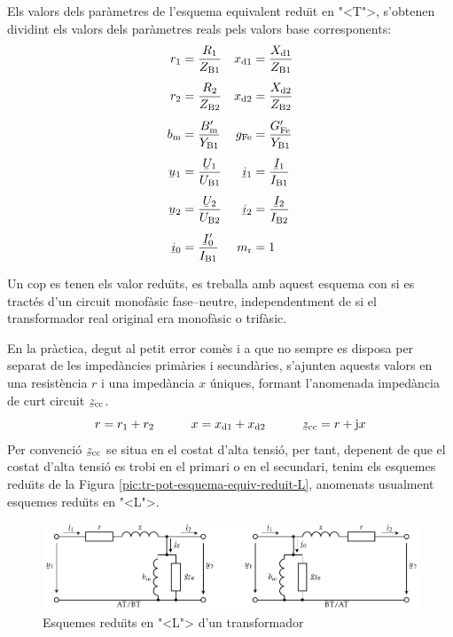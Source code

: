 Els valors dels par\`{a}metres de l'esquema equivalent redu\"{\i}t en {"<}T{">}, s'obtenen dividint els valors dels par\`{a}metres reals pels valors base corresponents:
\begin{align}
    r\ped{1} &=\frac{R\ped{1}}{Z\ped{B1}} &   x\ped{d1} &=\frac{X\ped{d1}}{Z\ped{B1}} \\[1ex]
    r\ped{2} &=\frac{R\ped{2}}{Z\ped{B2}} &   x\ped{d2} &=\frac{X\ped{d2}}{Z\ped{B2}} \\[1ex]
    b\ped{m} &=\frac{B\ped{m}'}{Y\ped{B1}}  &   g\ped{Fe} &=\frac{G\ped{Fe}'}{Y\ped{B1}} \\[1ex]
    \cmplx{u}_1 &=\frac{\cmplx{U}_1}{U\ped{B1}} &   \cmplx{i}_1 &=\frac{\cmplx{I}_1}{I\ped{B1}} \\[1ex]
    \cmplx{u}_2 &=\frac{\cmplx{U}_2}{U\ped{B2}} &   \cmplx{i}_2 &=\frac{\cmplx{I}_2}{I\ped{B2}} \\[1ex]
    \cmplx{i}_0 &=\frac{\cmplx{I}_0'}{I\ped{B1}} &   m\ped{r} &=1
\end{align}

Un cop es tenen els valor redu\"{\i}ts, es treballa amb aquest esquema con si es tract\'{e}s d'un circuit monof\`{a}sic fase--neutre, independentment de si el transformador real original era monof\`{a}sic o trif\`{a}sic.

En la pr\`{a}ctica, degut al petit error com\`{e}s i a que no sempre es disposa per separat de les imped\`{a}ncies prim\`{a}ries i secund\`{a}ries,  s'ajunten aquests valors en una resist\`{e}ncia $r$ i una  imped\`{a}ncia $x$ \'{u}niques, formant l'anomenada imped\`{a}ncia de curt circuit $\cmplx{z}\ped{cc}$.
\begin{equation}
    r= r\ped{1}+r\ped{2} \qquad\quad x= x\ped{d1}+x\ped{d2} \qquad\quad \cmplx{z}\ped{cc} = r + \ju x
\end{equation}
Per convenci\'{o} $\cmplx{z}\ped{cc}$ se situa en el costat d'alta tensi\'{o}, per tant, depenent de que el costat d'alta tensi\'{o} es trobi en el primari o en el secundari,  tenim els esquemes redu\"{\i}ts de la Figura \vref{pic:tr-pot-esquema-equiv-reduit-L}, anomenats usualment esquemes redu\"{\i}ts en {"<}L{">}.  
\begin{figure}[htb]
\centering
    \includegraphics{Imatges/Cap-TrafosPot-Esq-Equiv-Reduit-L.pdf}
\caption{Esquemes redu\"{\i}ts en {"<}L{">} d'un transformador}
\label{pic:tr-pot-esquema-equiv-reduit-L}
\end{figure}


